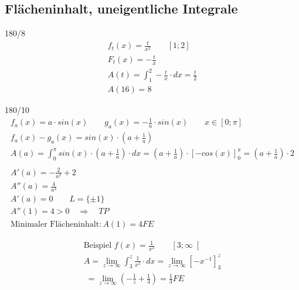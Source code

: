 \subsection{Flächeninhalt, uneigentliche Integrale}
\begin{exercise}{180/8}
  \begin{gather*}
    f_t(x) = \frac{t}{x^2} \qquad \left[1; 2\right] \\
    F_t(x) = -\frac{t}{x} \\
    A(t) = \int_1^2 -\frac{t}{x} \cdot dx = \frac{t}{2} \\
    A(16) = 8
  \end{gather*}
\end{exercise}
\begin{exercise}{180/10}
  \begin{gather*}
    f_a(x) = a \cdot sin(x) \qquad g_a(x) = -\frac{1}{a} \cdot sin(x) \qquad x \in \left[0; \pi\right] \\
    f_a(x) - g_a(x) = sin(x) \cdot (a + \frac{1}{a}) \\
    A(a) = \int_0^\pi sin(x) \cdot (a + \frac{1}{a}) \cdot dx = (a + \frac{1}{a}) \cdot \left[-cos(x)\right]_0^\pi = (a + \frac{1}{a}) \cdot 2 \\\\
    A'(a) = -\frac{2}{a^2} + 2 \\
    A''(a) = \frac{4}{a^3} \\
    A'(a) = 0 \qquad L = \{\pm1\} \\
    A''(1) = 4 > 0 \quad\Rightarrow\quad TP \\
    \text{Minimaler Flächeninhalt} \colon A(1) = 4FE
  \end{gather*}
\end{exercise}
\begin{gather*}
  \text{Beispiel } f(x) = \frac{1}{x^2} \qquad \left[3; \infty\right[ \\
  A = \lim\limits_{z \to \infty} \int_3^z \frac{1}{x^2} \cdot dx = \lim\limits_{z \to \infty} \left[-x^{-1}\right]_3^z \\
  \;= \lim\limits_{z \to \infty} (-\frac{1}{z} + \frac{1}{3}) = \frac{1}{3}FE
\end{gather*}
